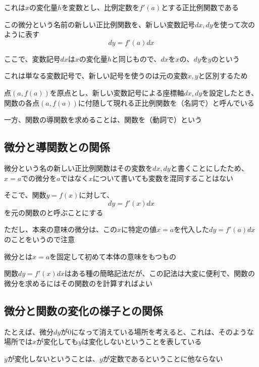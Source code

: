\documentclass[../book_infinite_continuous_math]{subfiles}
\begin{document}
これは$x$の変化量$h$を変数とし、比例定数を$f'(a)$とする正比例関数である

この微分という名前の新しい正比例関数を、新しい変数記号$dx, dy$を使って次のように表す
\begin{equation*}
  dy = f'(a)dx
\end{equation*}

ここで、変数記号$dx$は$x$の変化量$h$と同じもので、$dx$を$x$の、$dy$を$y$のという

これは単なる変数記号で、新しい記号を使うのは元の変数$x, y$と区別するため

\br

点$(a, f(a))$を原点とし、新しい変数記号による座標軸$dx,dy$を設定したとき、関数の各点$(a, f(a))$に付随して現れる正比例関数を（名詞で）と呼んでいる

一方、関数の導関数を求めることは、関数を（動詞で）という

\sectionline
\subsection{微分と導関数との関係}

微分という名の新しい正比例関数はその変数を$dx,dy$と書くことにしたため、$x=a$での微分を$a$ではなく$x$について書いても変数を混同することはない

そこで、関数$y=f(x)$に対して、
\begin{equation*}
  dy = f'(x)dx
\end{equation*}
を元の関数のと呼ぶことにする

ただし、本来の意味の微分は、この$x$に特定の値$x=a$を代入した$dy = f'(a)dx$のことをいうので注意

\br

微分とは$x=a$を固定して初めて本体の意味をもつもの

関数$dy = f'(x)dx$はある種の簡略記法だが、この記法は大変に便利で、関数の微分を求めるにはその関数のを計算すればよい

\sectionline
\subsection{微分と関数の変化の様子との関係}

たとえば、微分$dy$が$0$になって消えている場所を考えると、これは、そのような場所では$x$が変化しても$y$は変化しないということを表している

$y$が変化しないということは、$y$が定数であるということに他ならない
\end{document}
